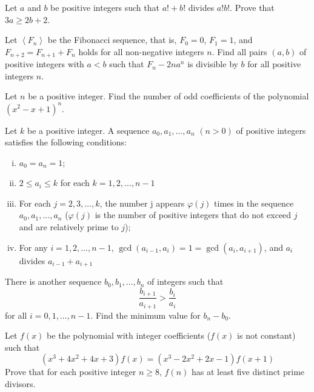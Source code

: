 \documentclass[problems.tex]{subfile}
\begin{document}
	\begin{problem}
		Let $a$ and $b$ be positive integers such that $a! + b!$ divides $a!b!$. Prove that $3a \ge 2b + 2$. %
	\end{problem}

	\begin{problem}
		Let $\left< F_n\right>$ be the Fibonacci sequence, that is, $F_0=0$, $F_1=1$, and $F_{n+2}=F_{n+1}+F_{n}$ holds for all non-negative integers $n$.
		Find all pairs $(a,b)$ of positive integers with $a < b$ such that $F_n-2na^n$ is divisible by $b$ for all positive integers $n$. %
	\end{problem}

	\begin{problem}
		Let $n$ be a positive integer. Find the number of odd coefficients of the polynomial $(x^2-x+1)^n$. %
	\end{problem}

	\begin{problem}
		Let $k$ be a positive integer. A sequence $a_0, a_1, \dots, a_n$ $(n>0)$ of positive integers satisfies the following conditions:
		\begin{enumerate}[(i)]
			\item $a_0=a_n=1$;
			\item $2\leq a_i\leq k$ for each $k=1,2,\dots,n-1$
			\item For each $j=2,3,\dots,k$, the number j appears $\varphi (j)$ times in the sequence $a_0,a_1,\dots,a_n$ ($\varphi (j)$ is the number of positive integers that do not exceed $j$ and are relatively prime to $j$);
			\item For any $i=1,2,\dots,n-1$, $\gcd(a_{i-1},a_i)=1=\gcd(a_i,a_{i+1})$, and $a_i$ divides $a_{i-1}+a_{i+1}$
		\end{enumerate}
		There is another sequence $b_0,b_1,\dots,b_n$ of integers such that $$\frac{b_{i+1}}{a_{i+1}}>\frac{b_i}{a_i}$$ for all $i=0,1,\dots,n-1$. Find the minimum value for $b_n-b_0$. %
	\end{problem}

	\begin{problem}
		Let $f(x)$ be the polynomial with integer coefficients ($f(x)$ is not constant) such that
		\[(x^3+4x^2+4x+3)f(x)=(x^3-2x^2+2x-1)f(x+1)\]Prove that for each positive integer $n\geq8$, $f(n)$ has at least five distinct prime divisors. %
	\end{problem}
\end{document}
